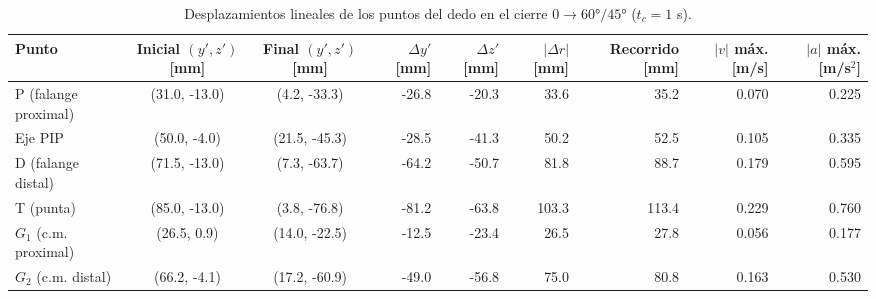 \begin{table}[H]
\centering

\begin{adjustbox}{max width=\textwidth}
\begin{tabular}{|l|c|c|r|r|r|r|r|r|}
\hline
\textbf{Punto} & \textbf{Inicial $(y', z')$ [mm]} & \textbf{Final $(y', z')$ [mm]} & \textbf{$\Delta y'$ [mm]} & \textbf{$\Delta z'$ [mm]} & \textbf{$|\Delta r|$ [mm]} & \textbf{Recorrido [mm]} & \textbf{$|v|$ máx. [m/s]} & \textbf{$|a|$ máx. [m/s$^2$]} \\ \hline
P (falange proximal) & (31.0, -13.0) & (4.2, -33.3) & -26.8 & -20.3 & 33.6 & 35.2 & 0.070 & 0.225 \\ \hline
Eje PIP & (50.0, -4.0) & (21.5, -45.3) & -28.5 & -41.3 & 50.2 & 52.5 & 0.105 & 0.335 \\ \hline
D (falange distal) & (71.5, -13.0) & (7.3, -63.7) & -64.2 & -50.7 & 81.8 & 88.7 & 0.179 & 0.595 \\ \hline
T (punta) & (85.0, -13.0) & (3.8, -76.8) & -81.2 & -63.8 & 103.3 & 113.4 & 0.229 & 0.760 \\ \hline
$G_1$ (c.m. proximal) & (26.5, 0.9) & (14.0, -22.5) & -12.5 & -23.4 & 26.5 & 27.8 & 0.056 & 0.177 \\ \hline
$G_2$ (c.m. distal) & (66.2, -4.1) & (17.2, -60.9) & -49.0 & -56.8 & 75.0 & 80.8 & 0.163 & 0.530 \\ \hline
\end{tabular}
\end{adjustbox}
\caption{Desplazamientos lineales de los puntos del dedo en el cierre $0 \rightarrow 60°/45°$ ($t_c = 1$ s).}
\label{tab:desplaz}
\end{table}
